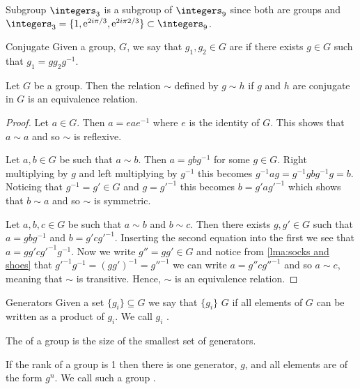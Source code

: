 \begin{exm}{Subgroup}{}
    \(\integers_3\) is a subgroup of \(\integers_9\) since both are groups and \(\integers_3 = \{1, \e^{2i\pi/3}, \e^{2i\pi 2/3}\} \subset \integers_9\).
\end{exm}

\begin{dfn}{Conjugate}{}
    Given a group, \(G\), we say that \(g_1, g_2 \in G\) are  if there exists \(g \in G\) such that \(g_1 = gg_2g^{-1}\).
\end{dfn}

\begin{lma}{}{}
    Let \(G\) be a group.
    Then the relation \(\sim\) defined by \(g \sim h\) if \(g\) and \(h\) are conjugate in \(G\) is an equivalence relation.
    \begin{proof}
        Let \(a \in G\).
        Then \(a = eae^{-1}\) where \(e\) is the identity of \(G\).
        This shows that \(a \sim a\) and so \(\sim\) is reflexive.
        
        Let \(a, b \in G\) be such that \(a \sim b\).
        Then \(a = gbg^{-1}\) for some \(g \in G\).
        Right multiplying by \(g\) and left multiplying by \(g^{-1}\) this becomes \(g^{-1}ag = g^{-1}gbg^{-1}g = b\).
        Noticing that \(g^{-1} = g' \in G\) and \(g = g'^{-1}\) this becomes \(b = g'ag'^{-1}\) which shows that \(b \sim a\) and so \(\sim\) is symmetric.
        
        Let \(a, b, c \in G\) be such that \(a \sim b\) and \(b \sim c\).
        Then there exists \(g, g' \in G\) such that \(a = gbg^{-1}\) and \(b = g'cg'^{-1}\).
        Inserting the second equation into the first we see that \(a = gg'cg'^{-1}g^{-1}\).
        Now we write \(g'' = gg' \in G\) and notice from \cref{lma:socks and shoes} that \(g'^{-1}g^{-1} = (gg')^{-1} = g''^{-1}\) we can write \(a = g''cg''^{-1}\) and so \(a \sim c\), meaning that \(\sim\) is transitive.
        Hence, \(\sim\) is an equivalence relation.
    \end{proof}
\end{lma}

\begin{dfn}{Generators}{}
    Given a set \(\{g_i\} \subseteq G\) we say that \(\{g_i\}\)  \(G\) if all elements of \(G\) can be written as a product of \(g_i\).
    We call \(g_i\) .
    
    The  of a group is the size of the smallest set of generators. 
    
    If the rank of a group is 1 then there is one generator, \(g\), and all elements are of the form \(g^n\).
    We call such a group .
\end{dfn}

